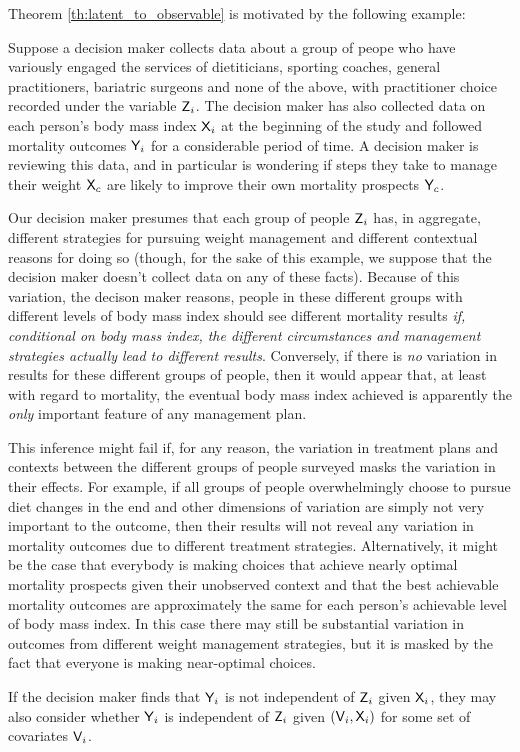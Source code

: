Theorem \ref{th:latent_to_observable} is motivated by the following example:

\begin{example}\label{ex:doctor_precedent}
Suppose a decision maker collects data about a group of peope who have variously engaged the services of dietiticians, sporting coaches, general practitioners, bariatric surgeons and none of the above, with practitioner choice recorded under the variable $\mathsf{Z}_i$. The decision maker has also collected data on each person's body mass index $\mathsf{X}_i$ at the beginning of the study and followed mortality outcomes $\mathsf{Y}_i$ for a considerable period of time. A decision maker is reviewing this data, and in particular is wondering if steps they take to manage their weight $\mathsf{X}_c$ are likely to improve their own mortality prospects $\mathsf{Y}_c$.

Our decision maker presumes that each group of people $\mathsf{Z}_i$ has, in aggregate, different strategies for pursuing weight management and different contextual reasons for doing so (though, for the sake of this example, we suppose that the decision maker doesn't collect data on any of these facts). Because of this variation, the decison maker reasons, people in these different groups with different levels of body mass index should see different mortality results \emph{if, conditional on body mass index, the different circumstances and management strategies actually lead to different results}. Conversely, if there is \emph{no} variation in results for these different groups of people, then it would appear that, at least with regard to mortality, the eventual body mass index achieved is apparently the \emph{only} important feature of any management plan.

This inference might fail if, for any reason, the variation in treatment plans and contexts between the different groups of people surveyed masks the variation in their effects. For example, if all groups of people overwhelmingly choose to pursue diet changes in the end and other dimensions of variation are simply not very important to the outcome, then their results will not reveal any variation in mortality outcomes due to different treatment strategies. Alternatively, it might be the case that everybody is making choices that achieve nearly optimal mortality prospects given their unobserved context and that the best achievable mortality outcomes are approximately the same for each person's achievable level of body mass index. In this case there may still be substantial variation in outcomes from different weight management strategies, but it is masked by the fact that everyone is making near-optimal choices.

If the decision maker finds that $\mathsf{Y}_i$ is not independent of $\mathsf{Z}_i$ given $\mathsf{X}_i$, they may also consider whether $\mathsf{Y}_i$ is independent of $\mathsf{Z}_i$ given $(\mathsf{V}_i,\mathsf{X}_i)$ for some set of covariates $\mathsf{V}_i$.
\end{example}

